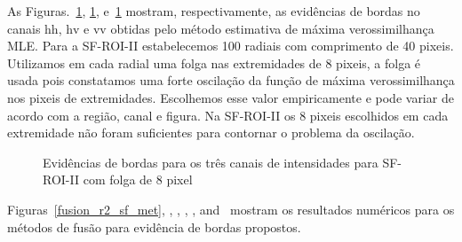 \pagebreak
As Figuras.~\ref{evidencias_r2_sf_hh_hv_vv}, \ref{evidencias_r2_sf_hh_hv_vv}, e~\ref{evidencias_r2_sf_hh_hv_vv} mostram, respectivamente, as evidências de bordas no canais $\text{hh}$, $\text{hv}$ e $\text{vv}$ obtidas pelo método estimativa de máxima verossimilhança MLE. Para a SF-ROI-II estabelecemos 100 radiais com comprimento de 40 pixeis. Utilizamos em cada radial uma folga nas extremidades de  8 pixeis, a folga é usada pois constatamos uma forte oscilação da função de máxima verossimilhança nos pixeis de extremidades. Escolhemos esse valor empiricamente e pode variar de acordo com a região, canal e figura. Na SF-ROI-II os 8 pixeis escolhidos em cada extremidade não foram suficientes para contornar o problema da oscilação. 
   \begin{figure}[htb]
	\centering
     
     \caption{Evidências de bordas para os três canais de intensidades para SF-ROI-II com folga de 8 pixel}
     \label{evidencias_r2_sf_hh_hv_vv} 
   \end{figure}


Figuras~\ref{fusion_r2_sf_met}, , , , , and~ mostram os resultados numéricos para os métodos de fusão para evidência de bordas propostos.

